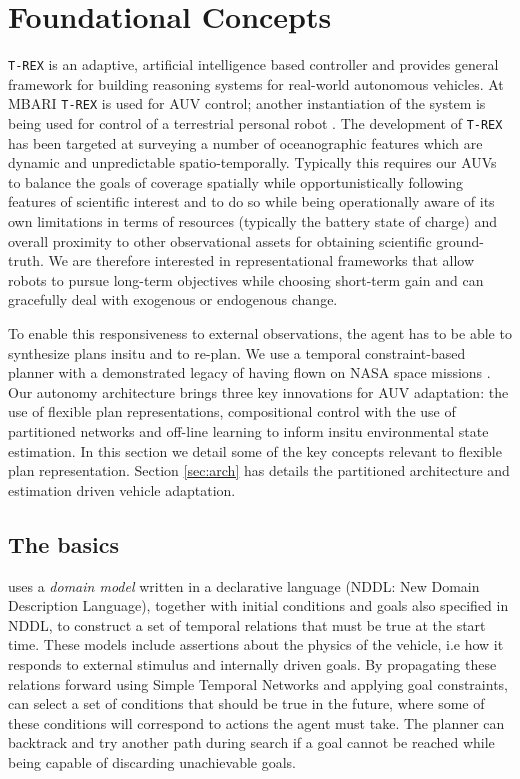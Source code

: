 \section{Foundational Concepts}
\label{sec:concepts}

\texttt{T-REX} is an adaptive, artificial intelligence based
controller and provides general framework for building reasoning
systems for real-world autonomous vehicles. At MBARI \texttt{T-REX} is
used for AUV control; another instantiation of the system is being
used for control of a terrestrial personal robot \cite{pr2,
  Meeussen:2010dn}. The development of \texttt{T-REX} has been
targeted at surveying a number of oceanographic features which are
dynamic and unpredictable spatio-temporally. Typically this requires
our AUVs to balance the goals of coverage spatially while
opportunistically following features of scientific interest and to do
so while being operationally aware of its own limitations in terms of
resources (typically the battery state of charge) and overall
proximity to other observational assets for obtaining scientific
ground-truth. We are therefore interested in representational
frameworks that allow robots to pursue long-term objectives while
choosing short-term gain and can gracefully deal with exogenous or
endogenous change.

To enable this responsiveness to external observations, the agent has
to be able to synthesize plans insitu and to re-plan. We use a
temporal constraint-based planner \eu with a demonstrated legacy of
having flown on NASA space missions \cite{jonsson00,bresina05,
  barreiro09}. Our autonomy architecture brings three key innovations
for AUV adaptation: the use of flexible plan representations,
compositional control with the use of partitioned networks and
off-line learning to inform insitu environmental state estimation. In
this section we detail some of the key concepts relevant to flexible
plan representation. Section \ref{sec:arch} has details the
\rx partitioned architecture and estimation driven vehicle
adaptation.

\subsection{The basics}
\label{sec:basics}

\eu uses a \emph{domain model} written in a declarative language
(NDDL: New Domain Description Language), together with initial
conditions and goals also specified in NDDL, to construct a set of
temporal relations that must be true at the start time. These models
include assertions about the physics of the vehicle, i.e how it
responds to external stimulus and internally driven goals. By
propagating these relations forward using Simple Temporal Networks
\cite{dechter91} and applying goal constraints, \eu can select a set
of conditions that should be true in the future, where some of these
conditions will correspond to actions the agent must take. The planner
can backtrack and try another path during search if a goal cannot be
reached while being capable of discarding unachievable goals.

